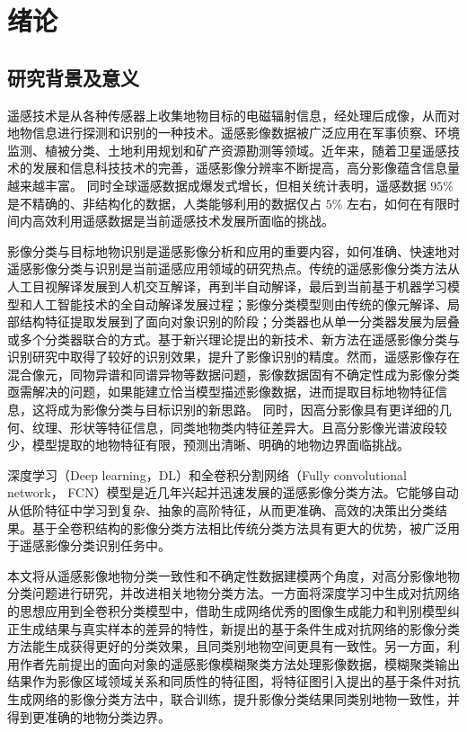 
\chapter{绪论}
\label{cha:chap01}

\section{研究背景及意义}
\label{sec:first}

遥感技术是从各种传感器上收集地物目标的电磁辐射信息，经处理后成像，从而对地物信息进行探测和识别的一种技术。遥感影像数据被广泛应用在军事侦察、环境监测、植被分类、土地利用规划和矿产资源勘测等领域\cite{lishihua2005}。近年来，随着卫星遥感技术的发展和信息科技技术的完善，遥感影像分辨率不断提高，高分影像蕴含信息量越来越丰富。 同时全球遥感数据成爆发式增长，但相关统计表明，遥感数据 $95\%$ 是不精确的、非结构化的数据，人类能够利用的数据仅占 $5\%$ 左右\cite{zhangjun2010}，如何在有限时间内高效利用遥感数据是当前遥感技术发展所面临的挑战。

影像分类与目标地物识别是遥感影像分析和应用的重要内容，如何准确、快速地对遥感影像分类与识别是当前遥感应用领域的研究热点。传统的遥感影像分类方法从人工目视解译发展到人机交互解译，再到半自动解译，最后到当前基于机器学习模型和人工智能技术的全自动解译发展过程；影像分类模型则由传统的像元解译、局部结构特征提取发展到了面向对象识别的阶段；分类器也从单一分类器发展为层叠或多个分类器联合的方式\cite{lideren2012}。基于新兴理论提出的新技术、新方法在遥感影像分类与识别研究中取得了较好的识别效果，提升了影像识别的精度。然而，遥感影像存在混合像元，同物异谱和同谱异物等数据问题\cite{wulun2006}，影像数据固有不确定性成为影像分类亟需解决的问题，如果能建立恰当模型描述影像数据，进而提取目标地物特征信息，这将成为影像分类与目标识别的新思路\cite{he2005comparison}。 同时，因高分影像具有更详细的几何、纹理、形状等特征信息，同类地物类内特征差异大。且高分影像光谱波段较少，模型提取的地物特征有限，预测出清晰、明确的地物边界面临挑战。


深度学习（Deep learning，DL）\cite{hinton2006fast}和全卷积分割网络（Fully convolutional network， FCN）\cite{long2015fully}模型是近几年兴起并迅速发展的遥感影像分类方法。它能够自动从低阶特征中学习到复杂、抽象的高阶特征，从而更准确、高效的决策出分类结果。基于全卷积结构的影像分类方法相比传统分类方法具有更大的优势，被广泛用于遥感影像分类识别任务中。

本文将从遥感影像地物分类一致性和不确定性数据建模两个角度，对高分影像地物分类问题进行研究，并改进相关地物分类方法。一方面将深度学习中生成对抗网络的思想应用到全卷积分类模型中，借助生成网络优秀的图像生成能力和判别模型纠正生成结果与真实样本的差异的特性，新提出的基于条件生成对抗网络的影像分类方法能生成获得更好的分类效果，且同类别地物空间更具有一致性。另一方面，利用作者先前提出的面向对象的遥感影像模糊聚类方法处理影像数据，模糊聚类输出结果作为影像区域领域关系和同质性的特征图，将特征图引入提出的基于条件对抗生成网络的影像分类方法中，联合训练，提升影像分类结果同类别地物一致性，并得到更准确的地物分类边界。



